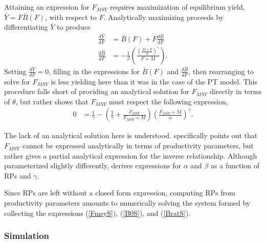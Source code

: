 \documentclass[12pt]{article}
\begin{document}
%
Attaining an expression for $F_{MSY}$ requires maximization of equilibrium 
yield, \mbox{$\bar{Y}=F\bar{B}(F)$}, with respect to $F$. Analytically maximizing 
proceeds by differentiating $\bar{Y}$ to produce
%
\begin{align}
\frac{d \bar{Y}}{dF} &= \bar B(F) + F \frac{d \bar B}{dF} \label{FderivS}\\
\frac{d \bar B}{dF} &= -\frac{1}{\beta}  \left(\frac{\left(\frac{M+F}{\alpha}\right)^\gamma}{F+M}\right)\label{dBdFS}.
\end{align}
%
Setting $\frac{d \bar{Y}}{dF}=0$, filling in the expressions for $\bar B(F)$ 
and $\frac{d \bar B}{dF}$, then rearranging to solve for $F_{MSY}$ is less 
yielding here than it was in the case of the PT model. This procedure falls 
short of providing an analytical solution for $F_{MSY}$ directly in terms of 
$\theta$, %
but rather shows that $F_{MSY}$ must respect the following expression,  
%
\begin{align}\label{FmsyS}
0 &= \frac{1}{\gamma} - \left(\frac{1}{\gamma} + \frac{F_{MSY}}{F_{MSY}+M}\right)\left(\frac{F_{MSY}+M}{\alpha}\right)^\gamma.  
\end{align}

The lack of an analytical solution here is understood. 
 specifically points out that 
$F_{MSY}$ cannot be expressed analytically in terms of productivity parameters, 
but rather gives a partial analytical expression for the inverse relationship. 
Although parameterized slightly differently,  
derives expressions for $\alpha$ and $\beta$ as a function of RPs and $\gamma$. 

%
Since RPs are left without a closed form expression, computing RPs from 
productivity parameters amounts to numerically solving the system formed by collecting the 
expressions (\ref{FmsyS}), (\ref{B0S}), and (\ref{BratS}).

%
\subsubsection{Simulation \label{sSim}}

\end{document}
